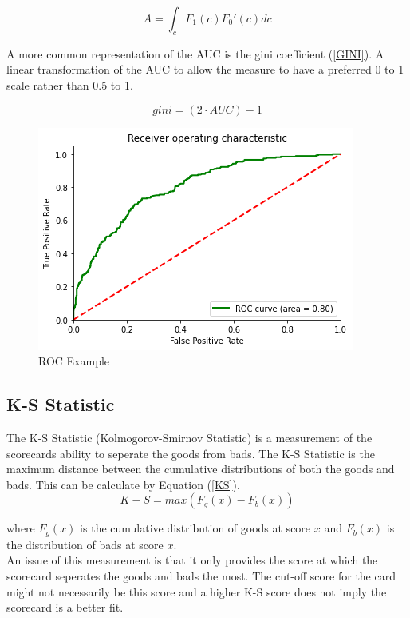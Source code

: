 \begin{equation}\label{AUC}
A = \int_{c}^{} F_1(c){F_0}'(c) dc
\end{equation}

A more common representation of the AUC is the gini coefficient (\ref{GINI}). A linear transformation of the AUC to allow the measure to have a preferred 0 to 1 scale rather than 0.5 to 1.

\begin{equation}\label{GINI}
gini = (2 \cdot AUC) - 1
\end{equation}

\begin{figure}[!ht]
	\centering
	\includegraphics[scale=1.00]{figs/roc_example.png}
	\caption{ROC Example \label{roc_example}}
\end{figure}

\subsection*{K-S Statistic}

The K-S Statistic (Kolmogorov-Smirnov Statistic) is a measurement of the scorecards ability to seperate the goods from bads. The K-S Statistic is the maximum distance between the cumulative distributions of both the goods and bads. This can be calculate by Equation (\ref{KS}). \\

\begin{equation}\label{KS}
K-S = max(F_{g}(x) - F_{b}(x))
\end{equation}

where $F_{g}(x)$ is the cumulative distribution of goods at score $x$ and $F_{b}(x)$ is the distribution of bads at score $x$. \\

An issue of this measurement is that it only provides the score at which the scorecard seperates the goods and bads the most. The cut-off score for the card might not necessarily be this score and a higher K-S score does not imply the scorecard is a better fit. 

